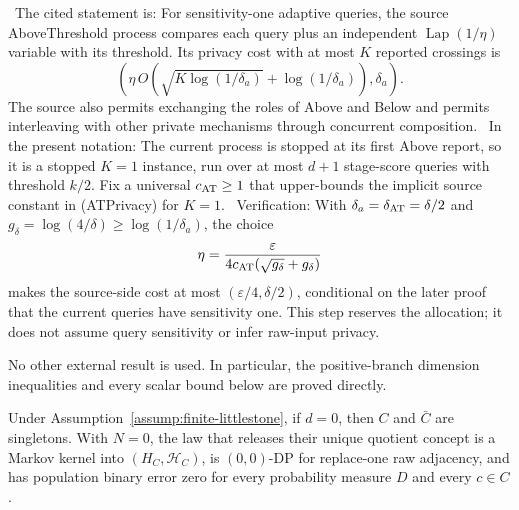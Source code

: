 \noindent\textbullet\ The cited statement is: For sensitivity-one adaptive queries, the source
  AboveThreshold process compares each query plus an independent
  \(\operatorname{Lap}(1/\eta)\) variable with its threshold. Its privacy
  cost with at most \(K\) reported crossings is
  \[
  \left(
  \eta\,O\!\left(\sqrt{K\log(1/\delta_a)}
       +\log(1/\delta_a)\right),\delta_a
  \right).
  \tag{ATPrivacy}
  \]
  The source also permits exchanging the roles of Above and Below and permits
  interleaving with other private mechanisms through concurrent composition.
\noindent\textbullet\ In the present notation: The current process is stopped at its first Above report,
  so it is a stopped \(K=1\) instance, run over at most \(d+1\) stage-score
  queries with threshold \(k/2\). Fix a universal \(c_{\rm AT}\ge1\) that
  upper-bounds the implicit source constant in (ATPrivacy) for \(K=1\).
\noindent\textbullet\ Verification: With
  \(\delta_a=\delta_{\rm AT}=\delta/2\) and
  \(g_\delta=\log(4/\delta)\ge\log(1/\delta_a)\), the choice
  \[
  \eta=\frac{\varepsilon}
  {4c_{\rm AT}(\sqrt{g_\delta}+g_\delta)}
  \]
  makes the source-side cost at most
  \((\varepsilon/4,\delta/2)\), conditional on the later proof that the
  current queries have sensitivity one. This step reserves the allocation;
  it does not assume query sensitivity or infer raw-input privacy.

No other external result is used. In particular, the positive-branch
dimension inequalities and every scalar bound below are proved directly.



\begin{proposition}\label{prop:step-001-zero}
Under Assumption~\ref{assump:finite-littlestone}, if \(d=0\), then \(C\)
and \(\bar C\) are singletons. With \(N=0\), the law that releases their
unique quotient concept is a Markov kernel into \((H_C,\mathcal H_C)\), is
\((0,0)\)-DP for replace-one raw adjacency, and has population binary error
zero for every probability measure \(D\) and every \(c\in C\).


\end{proposition}

